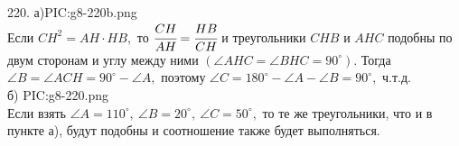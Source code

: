 220. а){{PIC:g8-220b.png}}\\
Если $CH^2=AH\cdot HB,$ то $\cfrac{CH}{AH}=\cfrac{HB}{CH}$ и треугольники $CHB$ и $AHC$ подобны по двум сторонам и углу между ними $(\angle AHC=\angle BHC=90^\circ).$ Тогда $\angle B=\angle ACH=90^\circ-\angle A,$ поэтому $\angle C=180^\circ-\angle A-\angle B=90^\circ,$ ч.т.д.\\
б) {{PIC:g8-220.png}}\\
Если взять $\angle A=110^\circ,\ \angle B=20^\circ,\ \angle C=50^\circ,$ то те же треугольники, что и в пункте а), будут подобны и соотношение также будет выполняться.\\
